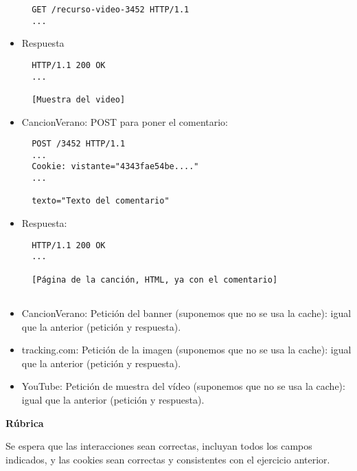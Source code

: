 \begin{itemize}
  \begin{verbatim}
  GET /recurso-video-3452 HTTP/1.1
  ...
\end{verbatim}

\item Respuesta

\begin{verbatim}
  HTTP/1.1 200 OK
  ...

  [Muestra del video]
\end{verbatim}
  
\item CancionVerano: POST para poner el comentario:

\begin{verbatim}
  POST /3452 HTTP/1.1
  ...
  Cookie: vistante="4343fae54be...."
  ...

  texto="Texto del comentario"
\end{verbatim}

\item Respuesta:

\begin{verbatim}
  HTTP/1.1 200 OK
  ...

  [Página de la canción, HTML, ya con el comentario]
  
\end{verbatim}

\item CancionVerano: Petición del banner (suponemos que no se usa la cache): igual que la anterior (petición y respuesta).

\item tracking.com: Petición de la imagen (suponemos que no se usa la cache): igual que la anterior (petición y respuesta).

\item YouTube: Petición de muestra del vídeo (suponemos que no se usa la cache): igual que la anterior (petición y respuesta).
\end{itemize}

\vspace{.4cm}\textbf{Rúbrica}

Se espera que las interacciones sean correctas, incluyan todos los campos indicados, y las cookies sean correctas y consistentes con el ejercicio anterior.

